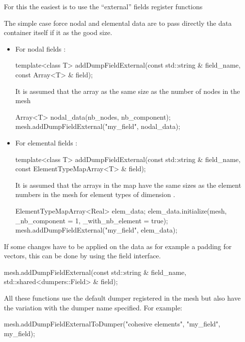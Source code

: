 For this the easiest is to use the ``external'' fields register functions

The simple case force nodal and elemental data are to pass directly the data
container itself if it as the good size.
\begin{itemize}
\item For nodal fields :
\begin{cpp}
  template<class T>
  addDumpFieldExternal(const std::string & field_name,
                       const Array<T> & field);
\end{cpp}

It is assumed that the array as the same size as the number of nodes in the mesh

\begin{cpp}
  Array<T> nodal_data(nb_nodes, nb_component);
  mesh.addDumpFieldExternal("my_field", nodal_data);
\end{cpp}

\item For elemental fields :

\begin{cpp}
  template<class T>
  addDumpFieldExternal(const std::string & field_name,
                       const ElementTypeMapArray<T> & field);
\end{cpp}

It is assumed that the arrays in the map have the same sizes as the element numbers in the mesh for element types of dimension .

\begin{cpp}
  ElementTypeMapArray<Real> elem_data;
  elem_data.initialize(mesh,
                       _nb_component = 1,
                       _with_nb_element = true);
  mesh.addDumpFieldExternal("my_field", elem_data);
\end{cpp}
\end{itemize}

If some changes have to be applied on the data as for example a padding for
 vectors, this can be done by using the
field interface.

\begin{cpp}
  mesh.addDumpFieldExternal(const std::string & field_name,
                             std::shared<dumpers::Field> & field);
\end{cpp}

All these functions use the default dumper registered in the mesh but  also have the  variation with the dumper name specified.
For example:
\begin{cpp}
  mesh.addDumpFieldExternalToDumper("cohesive elements",
                                    "my_field",
                                    my_field);
\end{cpp}


